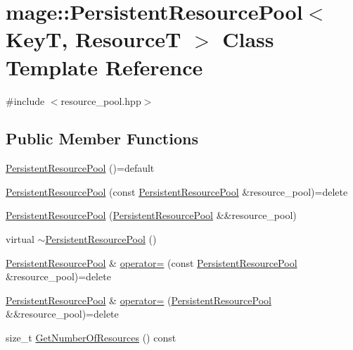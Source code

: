 \hypertarget{classmage_1_1_persistent_resource_pool}{}\section{mage\+:\+:Persistent\+Resource\+Pool$<$ KeyT, ResourceT $>$ Class Template Reference}
\label{classmage_1_1_persistent_resource_pool}


{\ttfamily \#include $<$resource\+\_\+pool.\+hpp$>$}

\subsection*{Public Member Functions}
\begin{DoxyCompactItemize}
\item 
\hyperlink{classmage_1_1_persistent_resource_pool_a23b83adf594628b93c368a2da7660ef8}{Persistent\+Resource\+Pool} ()=default
\item 
\hyperlink{classmage_1_1_persistent_resource_pool_a2677ca539988ead5d75be68110b6baee}{Persistent\+Resource\+Pool} (const \hyperlink{classmage_1_1_persistent_resource_pool}{Persistent\+Resource\+Pool} \&resource\+\_\+pool)=delete
\item 
\hyperlink{classmage_1_1_persistent_resource_pool_a44cbe367cdf7e1066c38a4c177b05fb7}{Persistent\+Resource\+Pool} (\hyperlink{classmage_1_1_persistent_resource_pool}{Persistent\+Resource\+Pool} \&\&resource\+\_\+pool)
\item 
virtual \hyperlink{classmage_1_1_persistent_resource_pool_a3408c2feb02a1d3b13c16d889fc50709}{$\sim$\+Persistent\+Resource\+Pool} ()
\item 
\hyperlink{classmage_1_1_persistent_resource_pool}{Persistent\+Resource\+Pool} \& \hyperlink{classmage_1_1_persistent_resource_pool_abae08ecfdeb096690bdbabc2a0b1f46b}{operator=} (const \hyperlink{classmage_1_1_persistent_resource_pool}{Persistent\+Resource\+Pool} \&resource\+\_\+pool)=delete
\item 
\hyperlink{classmage_1_1_persistent_resource_pool}{Persistent\+Resource\+Pool} \& \hyperlink{classmage_1_1_persistent_resource_pool_ad54817805379a1c16de14062333f0d1b}{operator=} (\hyperlink{classmage_1_1_persistent_resource_pool}{Persistent\+Resource\+Pool} \&\&resource\+\_\+pool)=delete
\item 
size\+\_\+t \hyperlink{classmage_1_1_persistent_resource_pool_a16019bc52d2a9eca0d0e239aac4c0566}{Get\+Number\+Of\+Resources} () const

\end{DoxyCompactItemize}
